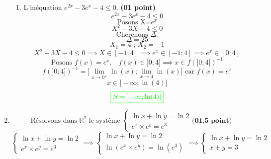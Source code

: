 \documentclass[12pt]{article}
\begin{document}
\begin{enumerate}
\begin{enumerate}
\item L'inéquation $e^{2x}-3e^{x}-4 \leq 0$. \textbf{(01 point)}
\[e^{2x}-3e^{x}-4 \leq 0\]
\[\text{Posons X=}e^{x} \]
\[X^{2}-3X-4 \leq 0\]
\[\text{Cherchons }\Delta.\]
\[\Delta=25\]
\[X_{1}=4 \text{ ; } X_{2}=-1\]
\[X^{2}-3X-4 \leq 0 \implies X\in [-1;4] \implies e^{x}\in [-1;4] \implies e^{x}\in [0;4]\]
\[\text{Posons } f(x)=e^{x}.\quad f(x)\in ]0;4]\implies x\in f(]0;4])^{-1}\]
\[f(]0;4])^{-1}=]\lim_{x \to 0^{+}}\ln(x);\lim_{x \to 4}\ln(x)] \text{ car }f(x)=e^{x}\]
\[x\in ]-\infty; \ln(4)]\]
\[ \textcolor{green}{\boxed{S=\left] -\infty; \ln(4)\right] }} \]
\end{enumerate}
\item \[ \text{Résolvons dans } \mathbb{R}^{2} \text{ le système }
\begin{cases}
\ln x + \ln y = \ln 2\\
e^{x}\times e^{y}=e^{3}
\end{cases}  \textbf{(01,5 point)}\]
\[
\begin{cases}
\ln x + \ln y = \ln 2\\
e^{x}\times e^{y}=e^{3}
\end{cases}\implies
\begin{cases}
\ln x + \ln y = \ln 2\\
\ln\left( e^{x}\times e^{y}\right) =\ln\left( e^{3} \right) 
\end{cases}\implies
\begin{cases}
\ln x + \ln y = \ln 2\\
x+y = 3 
\end{cases}
\]


\end{enumerate}
\end{document}
